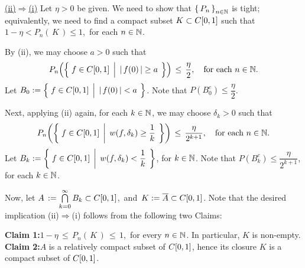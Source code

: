 \vskip 0.5cm
\noindent
\underline{(ii)\;$\Longrightarrow$\;(i)}
\vskip 0.2cm
\noindent
Let $\eta > 0$ be given.
We need to show that $\left\{\,P_{n}\,\right\}_{n\in\mathbb{N}}$ is tight;
equivalently, we need to find a compact subset $K \subset C[0,1]$ such that
\,$1 - \eta < P_{n}\!\left(\,K\,\right) \leq 1$,\, for each $n \in \mathbb{N}$.

\vskip 0.2cm
\noindent
By (ii), we may choose $a > 0$ such that
\begin{equation*}
P_{n}\!\left(\left\{\;
	f \in \Czo
	\;\left\vert\;\,
	\vert\,f(0)\,\vert \overset{{\color{white}.}}{\geq} a
	\right.
\;\right\}\right)
\,\leq\, \dfrac{\eta}{2},
\quad
\textnormal{for each $n \in \N$}.
\end{equation*}
Let $B_{0} := \left\{\;
	f \in \Czo
	\;\left\vert\;\,
	\vert\,f(0)\,\vert \overset{{\color{white}.}}{<} a
	\right.
\;\right\}$.
Note that $P(B_{0}^{c}) \leq \dfrac{\eta}{2}$.

\vskip 0.2cm
\noindent
Next, applying (ii) again, for each $k \in \mathbb{N}$, we may choose $\delta_{k} > 0$ such that
\begin{equation*}
P_{n}\!\left(\left\{\;
	f \in \Czo
	\;\left\vert\;\,
	w(f,\delta_{k}) \overset{{\color{white}.}}{\geq} \dfrac{1}{k}
	\right.
\;\right\}\right)
\,\leq\, \dfrac{\eta}{2^{k+1}},
\quad
\textnormal{for each $n \in \N$}.
\end{equation*}
Let $B_{k} := \left\{\;
	f \in \Czo
	\;\left\vert\;\,
	w(f,\delta_{k}) \overset{{\color{white}.}}{<} \dfrac{1}{k}
	\right.
\;\right\}$, for $k \in \mathbb{N}$.
Note that $P(B_{k}^{c}) \leq \dfrac{\eta}{2^{k+1}}$, for each $k \in \mathbb{N}$.

\vskip 0.2cm
\noindent
Now, let $A \,:= \overset{\infty}{\underset{k=0}{\bigcap}}\,B_{k} \subset C[0,1]$,\,
and \,$K := \overline{A} \subset C[0,1]$.
Note that the desired implication (ii)\;$\Longrightarrow$\;(i) follows from the following two Claims:

\begin{center}
\begin{minipage}{6.5in}
\noindent
\textbf{Claim 1:}\quad $1 - \eta \,\leq\, P_{n}\!\left(\,K\,\right) \,\leq\, 1$,\, for every $n \in \mathbb{N}$.
In particular, $K$ is non-empty.
\vskip 0.2cm
\textbf{Claim 2:}\quad $A$\; is a relatively compact subset of $C[0,1]$,
hence its closure $K$ is a compact subset of $C[0,1]$.
\end{minipage}
\end{center}

